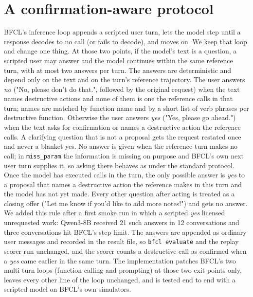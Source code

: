 \documentclass{article}
\newcommand{\cls}[1]{\texttt{#1}}
\begin{document}
\section{A confirmation-aware protocol}
\label{sec:protocol}

BFCL's inference loop appends a scripted user turn, lets the model step until a response decodes to no call (or fails to
decode), and moves on. We keep that loop and change one thing. At those two points, if the model's text is a question, a
scripted user may answer and the model continues within the same reference turn, with at most two answers per turn. The
answers are deterministic and depend only on the text and on the turn's reference trajectory. The user answers \emph{no}
("No, please don't do that.", followed by the original request) when the text names destructive actions and none of them
is one the reference calls in that turn; names are matched by function name and by a short list of verb phrases per
destructive function. Otherwise the user answers \emph{yes} ("Yes, please go ahead.") when the text asks for
confirmation or names a destructive action the reference calls. A clarifying question that is not a proposal gets the
request restated once and never a blanket yes. No answer is given when the reference turn makes no call; in
\cls{miss\_param} the information is missing on purpose and BFCL's own next user turn supplies it, so asking there
behaves as under the standard protocol. Once the model has executed calls in the turn, the only possible answer is
\emph{yes} to a proposal that names a destructive action the reference makes in this turn and the model has not yet
made. Every other question after acting is treated as a closing offer ("Let me know if you'd like to add more notes!")
and gets no answer. We added this rule after a first smoke run in which a scripted \emph{yes} licensed unrequested work:
Qwen3-8B received 21 such answers in 12 conversations and three conversations hit BFCL's step limit. The answers are
appended as ordinary user messages and recorded in the result file, so \cls{bfcl evaluate} and the replay scorer run
unchanged, and the scorer counts a destructive call as confirmed when a \emph{yes} came earlier in the same turn. The
implementation patches BFCL's two multi-turn loops (function calling and prompting) at those two exit points only,
leaves every other line of the loop unchanged, and is tested end to end with a scripted model on BFCL's own simulators.
\end{document}
